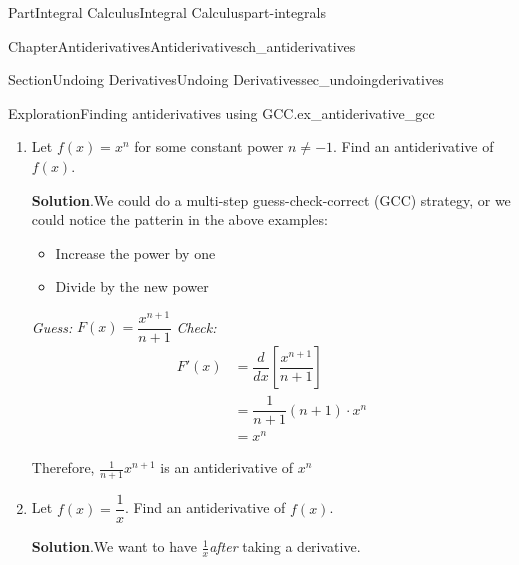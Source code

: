 \documentclass{tufte-book}
\newcommand{\blocktitlefont}{\relax}
\numberwithin{equation}{chapter}
\newcommand{\red}[1]{   {\color{red}   #1}   }
\newcommand{\ddx}[1]{ \dfrac{d}{dx} \Big[ #1 \Big]  }
\newcommand{\ddxfrac}[1]{ \dfrac{d}{dx} \left[ #1 \right]  }
\newcommand{\amp}{&}
\begin{document}
\begin{partptx}{Part}{Integral Calculus}{}{Integral Calculus}{}{}{part-integrals}
\begin{chapterptx}{Chapter}{Antiderivatives}{}{Antiderivatives}{}{}{ch_antiderivatives}
\begin{sectionptx}{Section}{Undoing Derivatives}{}{Undoing Derivatives}{}{}{sec_undoingderivatives}
\begin{exploration}{Exploration}{Finding antiderivatives using GCC.}{ex_antiderivative_gcc}
\begin{enumerate}[font=\bfseries,label=(\alph*),ref=\alph*]
\par
A general strategy is first to get the power of the antiderivative, and then get the coefficient.%
\begin{descriptionlist}
\begin{dlimedium}{Guess 1}{ex_antiderivative_gcc-3-2-2-1-1}%
\emph{Guess:} \(F(x) = x^{12}\)%
\par
\emph{Check:}%
\begin{equation*}
F'(x) = \ddx{x^{12}} = 12x^{11} \red{\ \neq\ x^11}
\end{equation*}
%
\end{dlimedium}%
\begin{dlimedium}{Guess 2}{ex_antiderivative_gcc-3-2-2-1-2}%
\emph{Guess:} \(F(x) = \frac{1}{12}x^{12}\)%
\par
\emph{Check:}%
\begin{equation*}
F'(x) = \ddx{\frac{1}{12}x^{12}} = \frac{1}{12}12x^{11} = x^11
\end{equation*}
%
\end{dlimedium}%
\end{descriptionlist}
Therefore \(\frac{1}{12}x^{12}\) is an antiderivative of \(x^{11}\)%
\item{}Let \(f(x)=x^n\) for some constant power \(n\neq -1\). Find an antiderivative of \(f(x)\).%
\par\smallskip%
\noindent\textbf{\blocktitlefont Solution}.\hypertarget{ex_antiderivative_gcc-4-2}{}\quad{}We could do a multi-step guess-check-correct (GCC) strategy, or we could notice the patterin in the above examples:%
\begin{itemize}[label=\textbullet]
\item{}Increase the power by one%
\item{}Divide by the new power%
\end{itemize}
%
\par
\emph{Guess:} \(F(x) = \dfrac{ x^{n+1} }{ n+1 }\) \emph{Check:}%
\begin{align*}
F'(x) \amp = \ddxfrac{ \dfrac{ x^{n+1} }{ n+1 } }\\
\amp = \dfrac{1}{n+1} (n+1) \cdot x^n\\
\amp = x^n
\end{align*}
%
\par
Therefore, \(\displaystyle \frac{1}{n+1}x^{n+1}\) is an antiderivative of \(x^n\)%
\item{}Let \(f(x) = \dfrac{1}{x}\).  Find an antiderivative of \(f(x)\).%
\par\smallskip%
\noindent\textbf{\blocktitlefont Solution}.\hypertarget{ex_antiderivative_gcc-5-2}{}\quad{}We want to have \(\frac{1}{x}\)\emph{after} taking a derivative.%

\end{enumerate}
\end{exploration}
\end{sectionptx}
\end{chapterptx}
\end{partptx}
\end{document}

